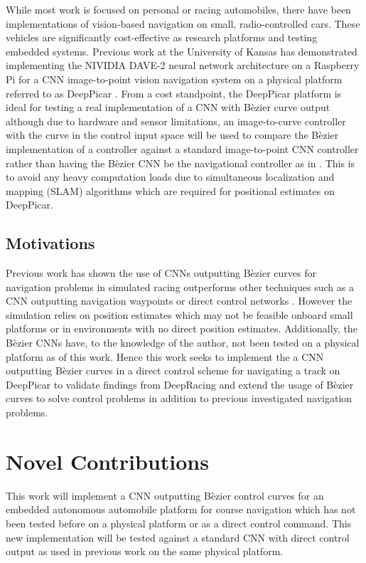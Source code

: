 \documentclass[conference]{IEEEtran}
\begin{document}
While most work is focused on personal or racing automobiles, there have been implementations of vision-based navigation on small, radio-controlled cars. These vehicles are significantly cost-effective as research platforms and testing embedded systems. Previous work at the University of Kansas has demonstrated implementing the NIVIDIA DAVE-2 neural network architecture on a Raspberry Pi for a CNN image-to-point vision navigation system  on a physical platform referred to as DeepPicar \cite{bechtel2018}. From a cost standpoint, the DeepPicar platform is ideal for testing a real implementation of a CNN with B\`ezier curve output although due to hardware and sensor limitations, an image-to-curve controller with the curve in the control input space will be used to compare the B\`ezier implementation of a controller against a standard image-to-point CNN controller rather than having the B\`ezier CNN be the navigational controller as in \cite{trent2020iros}. This is to avoid any heavy computation loads due to simultaneous localization and mapping (SLAM) algorithms which are required for positional estimates on DeepPicar.

\subsection{Motivations}

Previous work has shown the use of CNNs outputting B\`ezier curves for navigation problems in simulated racing outperforms other techniques such as a CNN outputting navigation waypoints or direct control networks \cite{trent2020iros}. However the simulation relies on position estimates which may not be feasible onboard small platforms or in environments with no direct position estimates. Additionally, the B\`ezier CNNs have, to the knowledge of the author, not been tested on a physical platform as of this work. Hence this work seeks to implement the a CNN outputting B\`ezier curves in a direct control scheme for navigating a track on DeepPicar to validate findings from DeepRacing and extend the usage of B\`ezier curves to solve control problems in addition to previous investigated navigation problems.

\section{Novel Contributions}

This work will implement a CNN outputting B\`ezier control curves for an embedded autonomous automobile platform for course navigation which has not been tested before on a physical platform or as a direct control command. This new implementation will be tested against a standard CNN with direct control output as used in previous work \cite{bechtel2018} on the same physical platform.
\end{document}
